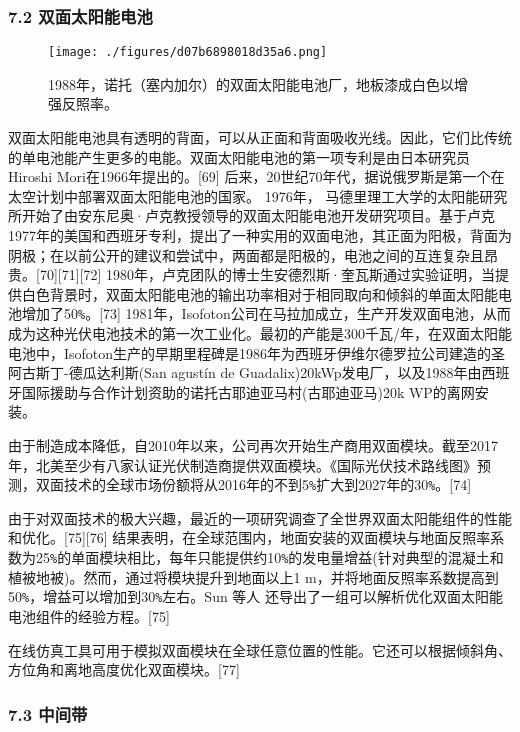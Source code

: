\subsubsection{7.2 双面太阳能电池}

\begin{figure}[ht]
\centering
\texttt{[image: ./figures/d07b6898018d35a6.png]}
\caption{1988年，诺托（塞内加尔）的双面太阳能电池厂，地板漆成白色以增强反照率。} \label{fig_TYNDC_5}
\end{figure}

双面太阳能电池具有透明的背面，可以从正面和背面吸收光线。因此，它们比传统的单电池能产生更多的电能。双面太阳能电池的第一项专利是由日本研究员Hiroshi Mori在1966年提出的。[69] 后来，20世纪70年代，据说俄罗斯是第一个在太空计划中部署双面太阳能电池的国家。 1976年， 马德里理工大学的太阳能研究所开始了由安东尼奥·卢克教授领导的双面太阳能电池开发研究项目。基于卢克1977年的美国和西班牙专利，提出了一种实用的双面电池，其正面为阳极，背面为阴极；在以前公开的建议和尝试中，两面都是阳极的，电池之间的互连复杂且昂贵。[70][71][72] 1980年，卢克团队的博士生安德烈斯·奎瓦斯通过实验证明，当提供白色背景时，双面太阳能电池的输出功率相对于相同取向和倾斜的单面太阳能电池增加了50\verb|%|。[73] 1981年，Isofoton公司在马拉加成立，生产开发双面电池，从而成为这种光伏电池技术的第一次工业化。最初的产能是300千瓦/年，在双面太阳能电池中，Isofoton生产的早期里程碑是1986年为西班牙伊维尔德罗拉公司建造的圣阿古斯丁-德瓜达利斯(San agustín de Guadalix)20kWp发电厂，以及1988年由西班牙国际援助与合作计划资助的诺托古耶迪亚马村(古耶迪亚马)20k WP的离网安装。

由于制造成本降低，自2010年以来，公司再次开始生产商用双面模块。截至2017年，北美至少有八家认证光伏制造商提供双面模块。《国际光伏技术路线图》预测，双面技术的全球市场份额将从2016年的不到5\verb|%|扩大到2027年的30\verb|%|。[74]

由于对双面技术的极大兴趣，最近的一项研究调查了全世界双面太阳能组件的性能和优化。[75][76] 结果表明，在全球范围内，地面安装的双面模块与地面反照率系数为25\verb|%|的单面模块相比，每年只能提供约10\verb|%|的发电量增益(针对典型的混凝土和植被地被)。然而，通过将模块提升到地面以上1 m，并将地面反照率系数提高到50\verb|%|，增益可以增加到30\verb|%|左右。Sun 等人 还导出了一组可以解析优化双面太阳能电池组件的经验方程。[75]

在线仿真工具可用于模拟双面模块在全球任意位置的性能。它还可以根据倾斜角、方位角和离地高度优化双面模块。[77]

\subsubsection{7.3 中间带}

